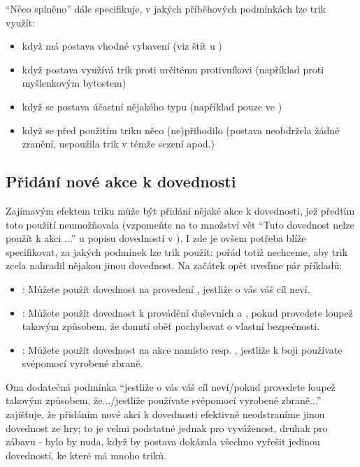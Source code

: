 \documentclass[../main.tex]{subfiles}
\begin{document}
``Něco splněno'' dále specifikuje, v jakých příběhových podmínkách lze trik využít:

\begin{itemize}
\item když má postava vhodné vybavení (viz štít u )
\item když postava využívá trik proti určitému protivníkovi (například proti myšlenkovým bytostem)
\item když se postava účastní nějakého typu  (například pouze ve )
\item když se před použitím triku něco (ne)přihodilo (postava neobdržela žádné zranění, nepoužila trik v témže sezení apod.)
\end{itemize}

\subsection{Přidání nové akce k dovednosti}
\label{sec:trik-pridani}

Zajímavým efektem triku může být přidání nějaké akce k dovednosti, jež předtím toto použití neumožňovala (vzpomeňte na to množství vět ``Tuto dovednost nelze použít k akci ...'' u popisu dovedností v ). I zde je ovšem potřeba blíže specifikovat, za jakých podmínek lze trik použít: pořád totiž nechceme, aby trik zcela nahradil nějakou jinou dovednost.  Na začátek opět uveďme pár příkladů:

\begin{itemize}
\item {}:
  Můžete použít dovednost  na provedení , jestliže o vás váš cíl neví.
\item {}:
  Můžete použít dovednost  k provádění duševních  a , pokud provedete loupež takovým způsobem, že donutí oběť pochybovat o vlastní bezpečnosti.
\item {}:
  Můžete použít dovednost  na akce  namísto  resp. , jestliže k boji používate svépomocí vyrobené zbraně.
\end{itemize}

Ona dodatečná podmínka ``jestliže o vás váš cíl neví/pokud provedete loupež takovým způsobem, že.../jestliže používate svépomocí vyrobené zbraně...'' zajišťuje, že přidáním nové akci k dovednosti efektivně neodstraníme jinou dovednost ze hry; to je velmi podstatné jednak pro vyváženost, druhak pro zábavu - bylo by nuda, když by postava dokázala všechno vyřešit jedinou dovedností, ke které má mnoho triků.
\end{document}
